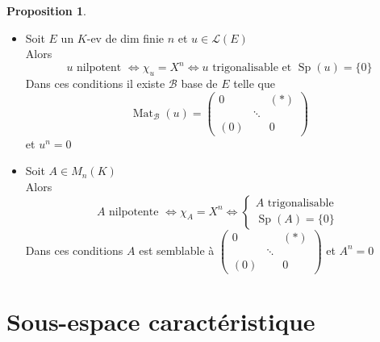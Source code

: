 \documentclass[10pt,a4paper]{article}
\theoremstyle{definition}
\newtheorem{proposition}{Proposition}[section]
\DeclareMathOperator{\Sp}{Sp}
\DeclareMathOperator*{\Mat}{Mat}
\begin{document}
\pagebreak

\begin{proposition}
\hfill \begin{itemize}
\item Soit $E$ un $K$-ev de dim finie $n$ et $u \in \mathcal{L}(E)$ \\
Alors 
\[ u \text{ nilpotent } \iff \chi_u = X^n \iff u \text{ trigonalisable et } \Sp(u) = \{ 0 \} \]
Dans ces conditions il existe $\mathcal{B}$ base de $E$ telle que
\[ \Mat_{\mathcal{B}}(u) = \begin{pmatrix}
0 & & (*) \\
 & \ddots & \\
 (0) & & 0
\end{pmatrix} \]
et $\boxed{u^n = 0}$
\item Soit $A \in M_n(K)$ \\
Alors
\[ A \text{ nilpotente } \iff \chi_A = X^n \iff \begin{cases}
A \text{ trigonalisable } \\
\Sp(A) = \{ 0 \}
\end{cases} \]
Dans ces conditions $A$ est semblable à $\begin{pmatrix}
0 & & (*) \\
& \ddots & \\
(0) & & 0
\end{pmatrix}$ et $A^n = 0$
\end{itemize}
\end{proposition}

\section{Sous-espace caractéristique}
\end{document}
